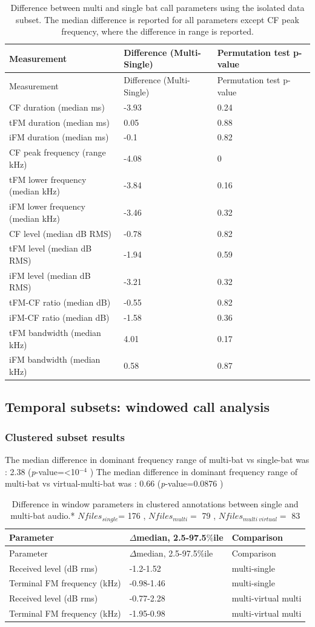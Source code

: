\documentclass[
]{book}
\begin{document}
\begin{longtable}[]{@{}lll@{}}
\caption{\label{tab:isolatedindcall} Difference between multi and single bat call parameters using the isolated data subset. The median difference is reported for all parameters except CF peak frequency, where the difference in range is reported.}\tabularnewline
\toprule
Measurement & Difference (Multi-Single) & Permutation test p-value\tabularnewline
\midrule
\endfirsthead
\toprule
Measurement & Difference (Multi-Single) & Permutation test p-value\tabularnewline
\midrule
\endhead
CF duration (median ms) & -3.93 & 0.24\tabularnewline
tFM duration (median ms) & 0.05 & 0.88\tabularnewline
iFM duration (median ms) & -0.1 & 0.82\tabularnewline
CF peak frequency (range kHz) & -4.08 & 0\tabularnewline
tFM lower frequency (median kHz) & -3.84 & 0.16\tabularnewline
iFM lower frequency (median kHz) & -3.46 & 0.32\tabularnewline
CF level (median dB RMS) & -0.78 & 0.82\tabularnewline
tFM level (median dB RMS) & -1.94 & 0.59\tabularnewline
iFM level (median dB RMS) & -3.21 & 0.32\tabularnewline
tFM-CF ratio (median dB) & -0.55 & 0.82\tabularnewline
iFM-CF ratio (median dB) & -1.58 & 0.36\tabularnewline
tFM bandwidth (median kHz) & 4.01 & 0.17\tabularnewline
iFM bandwidth (median kHz) & 0.58 & 0.87\tabularnewline
\bottomrule
\end{longtable}

\hypertarget{subsetswincall}{%
\subsection{Temporal subsets: windowed call analysis}\label{subsetswincall}}

\hypertarget{clustered-subset-results}{%
\subsubsection{Clustered subset results}\label{clustered-subset-results}}

The median difference in dominant frequency range of multi-bat vs single-bat was : 2.38 (\emph{p}-value=\textless10\(^{-4}\) )
The median difference in dominant frequency range of multi-bat vs virtual-multi-bat was : 0.66 (\emph{p}-value=0.0876 )

\begin{longtable}[]{@{}lll@{}}
\caption{\label{tab:clustered} Difference in window parameters in clustered annotations between single and multi-bat audio.* \(Nfiles_{single}\)= 176 , \(Nfiles_{multi}=\) 79 , \(Nfiles_{multi \:virtual}=\) 83}\tabularnewline
\toprule
Parameter & \(\Delta\)median, 2.5-97.5\(\%\)ile & Comparison\tabularnewline
\midrule
\endfirsthead
\toprule
Parameter & \(\Delta\)median, 2.5-97.5\(\%\)ile & Comparison\tabularnewline
\midrule
\endhead
Received level (dB rms) & -1.2-1.52 & multi-single\tabularnewline
Terminal FM frequency (kHz) & -0.98-1.46 & multi-single\tabularnewline
Received level (dB rms) & -0.77-2.28 & multi-virtual multi\tabularnewline
Terminal FM frequency (kHz) & -1.95-0.98 & multi-virtual multi\tabularnewline
\bottomrule
\end{longtable}
\end{document}
